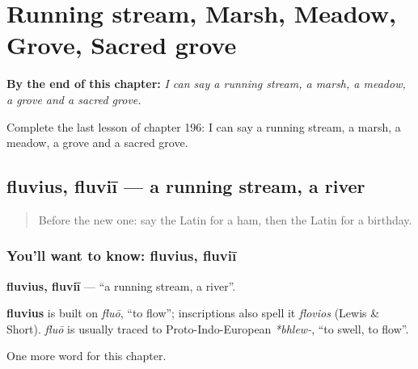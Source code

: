 
\chapter{Running stream, Marsh, Meadow, Grove, Sacred grove}
\label{ch:la-running-stream-marsh-meadow-grove-sacred-grove}

\begin{chapteropening}
\textbf{By the end of this chapter:} \emph{I can say a running stream, a marsh, a meadow, a grove and a sacred grove.}

Complete the last lesson of chapter 196: I can say a running stream, a marsh, a meadow, a grove and a sacred grove.
\end{chapteropening}

\section[fluvius, fluviī]{fluvius, fluviī — a running stream, a river}

\label{lesson:LA-C196-fluvius}



\begin{quote}
Before the new one: say the Latin for a ham, then the Latin for a birthday.
\end{quote}

\subsection*{You'll want to know: fluvius, fluviī}
\textbf{fluvius, fluviī} — \textquotedblleft{}a running stream, a river\textquotedblright{}.

\begin{cousinweb}
\textbf{fluvius} is built on \emph{fluō}, \textquotedblleft{}to flow\textquotedblright{}; inscriptions also spell it \emph{flovios} (Lewis \& Short). \emph{fluō} is usually traced to Proto-Indo-European \emph{*bhlew-}, \textquotedblleft{}to swell, to flow\textquotedblright{}.
\end{cousinweb}

\begin{grammarlens}[title={What you've built}]
One more word for this chapter.
\end{grammarlens}

